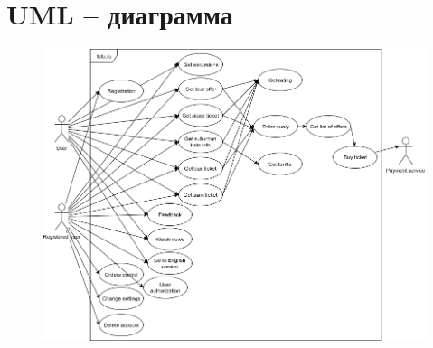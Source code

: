 ﻿\documentclass[article]{article}
\begin{document}
\section*{UML -- диаграмма}
\begin{figure}[hp]
\includegraphics[width=1\textwidth]{./img/Test3UML.png}
\end{figure}

\newpage
\end{document}
